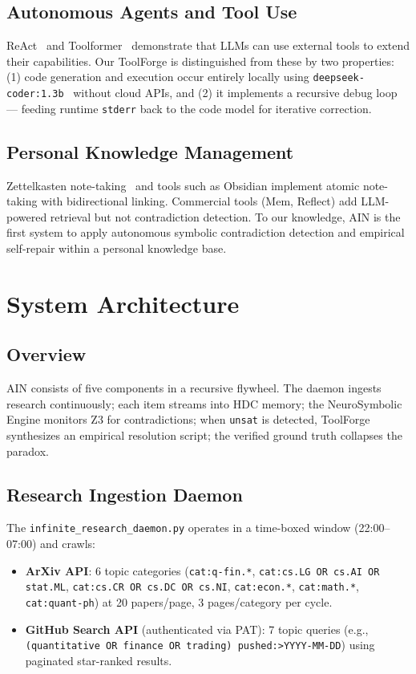 \documentclass[sigconf]{acmart}
\begin{document}
\subsection{Autonomous Agents and Tool Use}
ReAct~\cite{react} and Toolformer~\cite{toolformer} demonstrate that LLMs can use external tools to extend their capabilities. Our ToolForge is distinguished from these by two properties: (1) code generation and execution occur entirely locally using \texttt{deepseek-coder:1.3b}~\cite{deepseek_coder} without cloud APIs, and (2) it implements a recursive debug loop --- feeding runtime \texttt{stderr} back to the code model for iterative correction.

\subsection{Personal Knowledge Management}
Zettelkasten note-taking~\cite{ahrens2017} and tools such as Obsidian implement atomic note-taking with bidirectional linking. Commercial tools (Mem, Reflect) add LLM-powered retrieval but not contradiction detection. To our knowledge, AIN is the first system to apply autonomous symbolic contradiction detection and empirical self-repair within a personal knowledge base.

\section{System Architecture}

\subsection{Overview}

AIN consists of five components in a recursive flywheel. The daemon ingests research continuously; each item streams into HDC memory; the NeuroSymbolic Engine monitors Z3 for contradictions; when \texttt{unsat} is detected, ToolForge synthesizes an empirical resolution script; the verified ground truth collapses the paradox.

\subsection{Research Ingestion Daemon}

The \texttt{infinite\_research\_daemon.py} operates in a time-boxed window (22:00--07:00) and crawls:
\begin{itemize}
  \item \textbf{ArXiv API}: 6 topic categories (\texttt{cat:q-fin.*}, \texttt{cat:cs.LG OR cs.AI OR stat.ML}, \texttt{cat:cs.CR OR cs.DC OR cs.NI}, \texttt{cat:econ.*}, \texttt{cat:math.*}, \texttt{cat:quant-ph}) at 20 papers/page, 3 pages/category per cycle.
  \item \textbf{GitHub Search API} (authenticated via PAT): 7 topic queries (e.g., \texttt{(quantitative OR finance OR trading) pushed:>YYYY-MM-DD}) using paginated star-ranked results.
\end{itemize}
\end{document}
